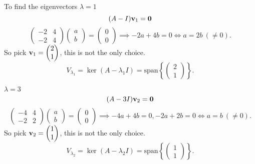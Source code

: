 \documentclass[10pt, a4paper]{article}
\begin{document}
\begin{example}
\begin{solution}
        To find the eigenvectors
        $\lambda = 1$
        \[
        (A - I)\mathbf{v}_1 = \mathbf{0}
        \]
        \[
        \begin{pmatrix}
            -2 & 4 \\
            -2 & 4
        \end{pmatrix}\begin{pmatrix}
            a \\ b
        \end{pmatrix} = \begin{pmatrix}
            0 \\ 0
        \end{pmatrix} \implies -2a + 4b = 0 \iff a = 2b\ (\neq 0).
        \]
        So pick $\mathbf{v}_1 = \begin{pmatrix}
            2 \\ 1
        \end{pmatrix}$,
        this is not the only choice.
        \[
        V_{\lambda_1} = \ker(A - \lambda_1I) = \mathrm{span}\left\{\begin{pmatrix}
            2 \\ 1
        \end{pmatrix}\right\}.
        \]
        
        $\lambda = 3$
        \[
        (A - 3I)\mathbf{v}_2 = \mathbf{0}
        \]
        \[
        \begin{pmatrix}
            -4 & 4 \\
            -2 & 2
        \end{pmatrix}\begin{pmatrix}
            a \\ b
        \end{pmatrix} = \begin{pmatrix}
            0 \\ 0
        \end{pmatrix} \implies -4a + 4b = 0, -2a + 2b = 0 \iff a = b\ (\neq 0).
        \]
        So pick $\mathbf{v}_2 = \begin{pmatrix}
            1 \\ 1
        \end{pmatrix}$,
        this is not the only choice.
        \[
        V_{\lambda_2} = \ker(A - \lambda_2I) = \mathrm{span}\left\{\begin{pmatrix}
            1 \\ 1
        \end{pmatrix}\right\}.
        \]
        

\end{solution}
\end{example}
\end{document}
